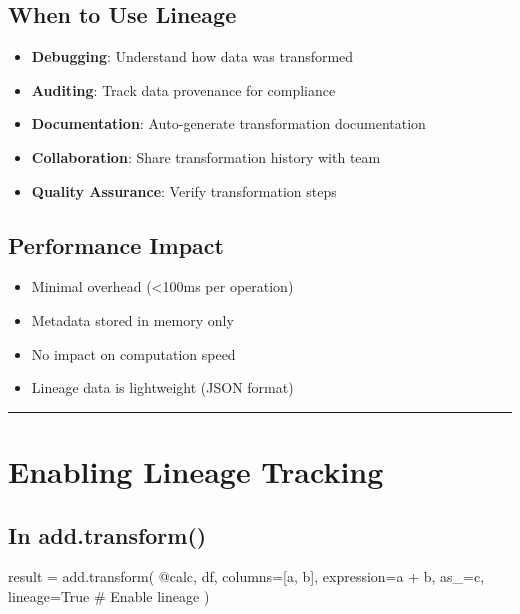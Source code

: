 \documentclass[
  letterpaper,
]{scrbook}
\newenvironment{Shaded}{\begin{snugshade}}{\end{snugshade}}
\newcommand{\CommentTok}[1]{\textcolor[rgb]{0.37,0.37,0.37}{#1}}
\newcommand{\NormalTok}[1]{\textcolor[rgb]{0.00,0.23,0.31}{#1}}
\newcommand{\OperatorTok}[1]{\textcolor[rgb]{0.37,0.37,0.37}{#1}}
\newcommand{\StringTok}[1]{\textcolor[rgb]{0.13,0.47,0.30}{#1}}
\newcommand{\VariableTok}[1]{\textcolor[rgb]{0.07,0.07,0.07}{#1}}
\providecommand{\tightlist}{%
  \setlength{\itemsep}{0pt}\setlength{\parskip}{0pt}}
\begin{document}
\subsection{When to Use Lineage}\label{when-to-use-lineage-1}

\begin{itemize}
\tightlist
\item
  \textbf{Debugging}: Understand how data was transformed
\item
  \textbf{Auditing}: Track data provenance for compliance
\item
  \textbf{Documentation}: Auto-generate transformation documentation
\item
  \textbf{Collaboration}: Share transformation history with team
\item
  \textbf{Quality Assurance}: Verify transformation steps
\end{itemize}

\subsection{Performance Impact}\label{performance-impact-1}

\begin{itemize}
\tightlist
\item
  Minimal overhead (\textless100ms per operation)
\item
  Metadata stored in memory only
\item
  No impact on computation speed
\item
  Lineage data is lightweight (JSON format)
\end{itemize}

\begin{center}\rule{0.5\linewidth}{0.5pt}\end{center}

\section{Enabling Lineage Tracking}\label{enabling-lineage-tracking-1}

\subsection{In add.transform()}\label{in-add.transform-1}

\begin{Shaded}
\begin{Highlighting}[]
\NormalTok{result }\OperatorTok{=}\NormalTok{ add.transform(}
    \StringTok{\textquotesingle{}@calc\textquotesingle{}}\NormalTok{,}
\NormalTok{    df,}
\NormalTok{    columns}\OperatorTok{=}\NormalTok{[}\StringTok{\textquotesingle{}a\textquotesingle{}}\NormalTok{, }\StringTok{\textquotesingle{}b\textquotesingle{}}\NormalTok{],}
\NormalTok{    expression}\OperatorTok{=}\StringTok{\textquotesingle{}a + b\textquotesingle{}}\NormalTok{,}
\NormalTok{    as\_}\OperatorTok{=}\StringTok{\textquotesingle{}c\textquotesingle{}}\NormalTok{,}
\NormalTok{    lineage}\OperatorTok{=}\VariableTok{True}  \CommentTok{\# Enable lineage}
\NormalTok{)}
\end{Highlighting}
\end{Shaded}
\end{document}
